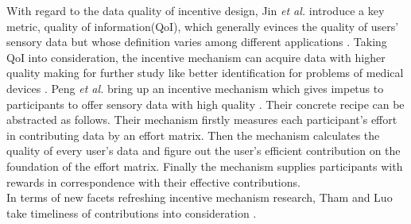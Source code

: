 \documentclass[10pt,conference,compsocconf,letterpaper]{IEEEtran}
\begin{document}
With regard to the data quality of incentive design, Jin \emph{et al.} introduce a key metric, quality of information(QoI), which generally evinces the quality of users’ sensory data but whose definition varies among different applications \cite{Jin2015Quality}. Taking QoI into consideration, the incentive mechanism can acquire data with higher quality making for further study like better identification for problems of medical devices \cite{Jin2015Quality}. %
Peng \emph {et al.}
bring up an incentive mechanism which gives impetus to participants to offer sensory data with high quality \cite{Peng2015Pay}. Their concrete recipe can be abstracted as follows. Their mechanism firstly measures each participant's effort in contributing data by an effort matrix. %
Then the mechanism calculates the quality of every user's data and figure out the user's efficient contribution on the foundation of the effort matrix. Finally %
the mechanism supplies participants with rewards in correspondence with their effective contributions.\\
\indent In terms of new facets refreshing incentive mechanism research, Tham and Luo take timeliness of contributions into consideration \cite{Tham2013Quality}. %
\end{document}
